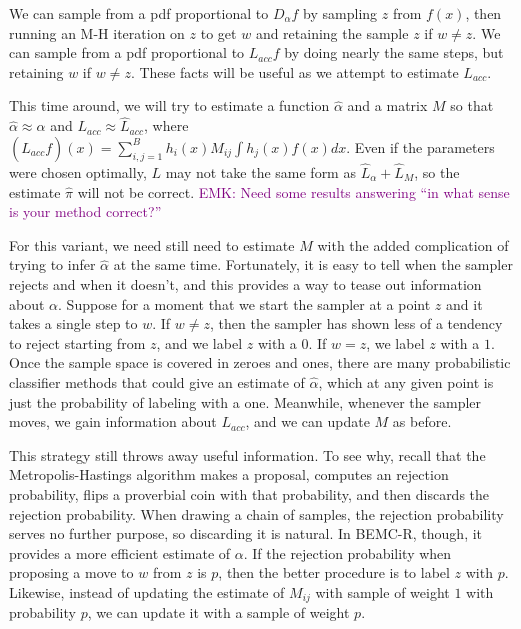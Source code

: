 \documentclass{article}
\newcommand\EMK[1]{\textcolor{purple}{EMK: #1}}
\begin{document}
We can sample from a pdf proportional to $D_{\alpha}f$ by sampling $z$ from $f(x)$, then running an M-H iteration on $z$ to get $w$ and retaining the sample $z$ if $w \neq z$. We can sample from a pdf proportional to $L_{acc}f$ by doing nearly the same steps, but retaining $w$ if $w \neq z$. These facts will be useful as we attempt to estimate $L_{acc}$.

This time around, we will try to estimate a function $\hat{\alpha}$ and a matrix $M$ so that $\hat{\alpha}\approx{\alpha}$ and $L_{acc} \approx \hat{L}_{acc}$, where $(\hat{L}_{acc}f)(x) =\sum_{i,j=1}^B h_i(x)M_{ij}\int h_j(x)f(x)dx$. Even if the parameters were chosen optimally, $L$ may not take the same form as $\hat{L}_{\alpha}+\hat{L}_{M}$, so the estimate $\hat{\pi}$ will not be correct. \EMK{Need some results answering ``in what sense is your method correct?''}

For this variant, we need still need to estimate $M$ with the added complication of trying to infer $\hat{\alpha}$ at the same time. Fortunately, it is easy to tell when the sampler rejects and when it doesn't, and this provides a way to tease out information about $\alpha$. Suppose for a moment that we start the sampler at a point $z$ and it takes a single step to $w$. If $w \neq z$, then the sampler has shown less of a tendency to reject starting from $z$, and we label $z$ with a $0$. If $w = z$, we label $z$ with a $1$. Once the sample space is covered in zeroes and ones, there are many probabilistic classifier methods that could give an estimate of $\hat{\alpha}$, which at any given point is just the probability of labeling with a one. Meanwhile, whenever the sampler moves, we gain information about $L_{acc}$, and we can update $M$ as before. 

This strategy still throws away useful information. To see why, recall that the Metropolis-Hastings algorithm makes a proposal, computes an rejection probability, flips a proverbial coin with that probability, and then discards the rejection probability. When drawing a chain of samples, the rejection probability serves no further purpose, so discarding it is natural. In BEMC-R, though, it provides a more efficient estimate of $\alpha$. If the rejection probability when proposing a move to $w$ from $z$ is $p$, then the better procedure is to label $z$ with $p$. Likewise, instead of updating the estimate of $M_{ij}$ with sample of weight $1$ with probability $p$, we can update it with a sample of weight $p$.
\end{document}
